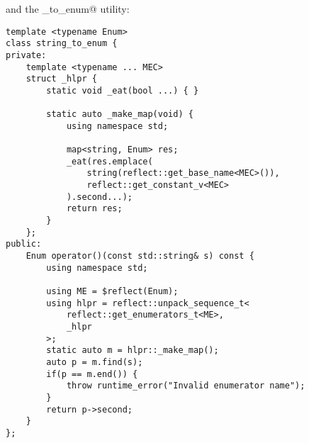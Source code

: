 and the \verb@string_to_enum@ utility:

\begin{verbatim}
template <typename Enum>
class string_to_enum {
private:
	template <typename ... MEC>
	struct _hlpr {
		static void _eat(bool ...) { }

		static auto _make_map(void) {
			using namespace std;

			map<string, Enum> res;
			_eat(res.emplace(
				string(reflect::get_base_name<MEC>()),
				reflect::get_constant_v<MEC>
			).second...);
			return res;
		}
	};
public:
	Enum operator()(const std::string& s) const {
		using namespace std;

		using ME = $reflect(Enum);
		using hlpr = reflect::unpack_sequence_t<
			reflect::get_enumerators_t<ME>,
			_hlpr
		>;
		static auto m = hlpr::_make_map();
		auto p = m.find(s);
		if(p == m.end()) {
			throw runtime_error("Invalid enumerator name");
		}
		return p->second;
	}
};
\end{verbatim}

